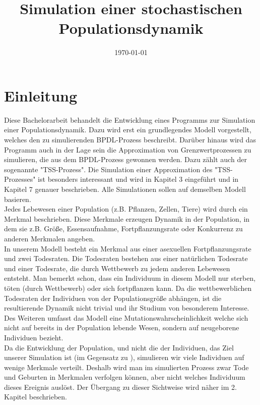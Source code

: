 \documentclass[11pt, a4paper, german]{article}
\date{\today}
\title{Simulation einer stochastischen Populationsdynamik}
\theoremstyle{plain}
\begin{document}
\maketitle
\setcounter{tocdepth}{2}
\tableofcontents


\clearpage
\section{Einleitung}
Diese Bachelorarbeit behandelt die Entwicklung eines Programms zur Simulation einer Populationsdynamik. Dazu wird erst ein grundlegendes Modell vorgestellt, welches den zu simulierenden BPDL-Prozess beschreibt. Darüber hinaus wird das Programm auch in der Lage sein die Approximation von Grenzwertprozessen zu simulieren, die aus dem BPDL-Prozess gewonnen werden. Dazu zählt auch der sogenannte "{}TSS-Prozess"{}. Die Simulation einer Approximation des "{}TSS-Prozesses"{} ist besonders interessant und wird in Kapitel 3 eingeführt und in Kapitel 7 genauer beschrieben. Alle Simulationen sollen auf demselben Modell basieren.\\
Jedes Lebewesen einer Population (z.B. Pflanzen, Zellen, Tiere) wird durch ein Merkmal beschrieben. Diese Merkmale erzeugen Dynamik in der Population, in dem sie z.B. Größe, Essensaufnahme, Fortpflanzungsrate oder Konkurrenz zu anderen Merkmalen angeben.\\
In unserem Modell besteht ein Merkmal aus einer asexuellen Fortpflanzungsrate und zwei Todesraten. Die Todesraten bestehen aus einer natürlichen Todesrate und einer Todesrate, die durch Wettbewerb zu jedem anderen Lebewesen entsteht. Man bemerkt schon, dass ein Individuum in diesem Modell nur sterben, töten (durch Wettbewerb) oder sich fortpflanzen kann. Da die wettbewerblichen Todesraten der Individuen von der Populationsgröße abhängen, ist die resultierende Dynamik nicht trivial und ihr Studium von besonderem Interesse.\\
Des Weiteren umfasst das Modell eine Mutationswahrscheinlichkeit welche sich nicht auf bereits in der Population lebende Wesen, sondern auf neugeborene Individuen bezieht.\\
Da die Entwicklung der Population, und nicht die der Individuen, das Ziel unserer Simulation ist (im Gegensatz zu \cite{fournier2004microscopic}), simulieren wir viele Individuen auf wenige Merkmale verteilt. Deshalb wird man im simulierten Prozess zwar Tode und Geburten in Merkmalen verfolgen können, aber nicht welches Individuum dieses Ereignis auslöst. Der Übergang zu dieser Sichtweise wird näher im 2. Kapitel beschrieben.\\
\end{document}
